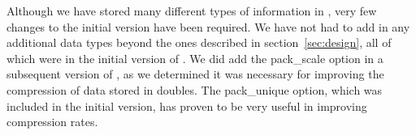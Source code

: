 Although we have stored many different types of information in \DataSeries{},
very few changes to the initial version have been required.
We have not had to add in any additional data
types beyond the ones described in section~\ref{sec:design},
all of which were in the initial version of \DataSeries{}.
We did add the pack\_scale option in a subsequent version of \DataSeries{},
as we determined it was necessary for improving the compression of
data stored in doubles.  
The pack\_unique option, which was included in the initial version,
has proven to be very useful in improving compression rates.

%


